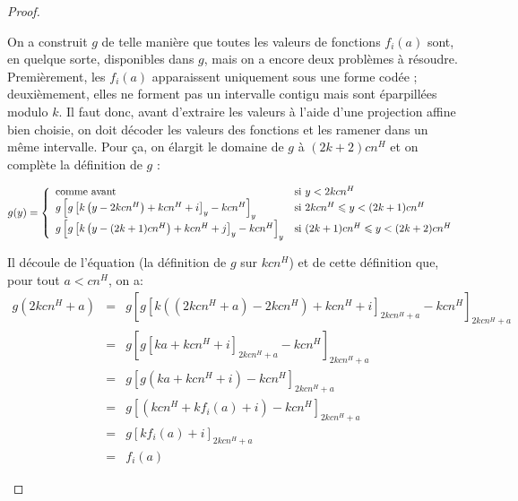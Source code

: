 \documentclass{article}
\begin{document}
\begin{proof}
\begin{enumerate}[itemsep=-1mm,leftmargin=2cm]
					On a construit $g$ de telle manière que toutes les valeurs de fonctions $f_i(a)$ sont, en quelque sorte, disponibles dans $g$, mais on a encore deux problèmes à résoudre. Premièrement, les $f_i(a)$ apparaissent uniquement sous une forme codée ; deuxièmement, elles ne forment pas un intervalle contigu mais sont éparpillées modulo $k$. Il faut donc, avant d'extraire les valeurs à l'aide d'une projection affine bien choisie, on doit décoder les valeurs des fonctions et les ramener dans un même intervalle. Pour ça, on élargit le domaine de $g$ à $(2k+2)cn^H$ et on complète la définition de $g$ :
					
					\[
						g(y) = \left\lbrace \begin{array}{ll} 
							\text{comme avant} & \text{si $y < 2kcn^H$} \\
							g\left[ g\left[ k\left( y - 2kcn^H \right) + kcn^H  + i\right]_y - kcn^H  \right]_y & \text{si $2kcn^H \leqslant y < (2k+1)cn^H$} \\
							g\left[ g\left[ k\left( y - (2k + 1)cn^H \right) + kcn^H  + j \right]_y - kcn^H  \right]_y & \text{si $(2k+1)cn^H \leqslant y < (2k+2)cn^H$} \\
							 \end{array} \right.
					\]
					
					Il découle de l'équation \redtext{$(\star)$} (la définition de $g$ sur $kcn^H$) et de cette définition que, pour tout $a < cn^H$, on a\footnotemark :
					\setcounter{equation}{0}
					\begin{eqnarray}
						g\left( 2kcn^H + a\right)	& = & 		g\left[ g\left[ k\left( \left(2kcn^H + a\right) - 2kcn^H \right) + kcn^H  + i\right]_{2kcn^H + a} - kcn^H  \right]_{2kcn^H + a} \\
													& = & 		g\left[ g\left[ k a + kcn^H  + i\right]_{2kcn^H + a} - kcn^H  \right]_{2kcn^H + a} \\
													& = & 		g\left[ g\left( k a + kcn^H  + i\right) - kcn^H  \right]_{2kcn^H + a} \\
													& = & 		g\left[ \left(kcn^H  +  k f_i(a) + i\right) - kcn^H  \right]_{2kcn^H + a} \\
													& = & 		g\left[ k f_i(a) + i \right]_{2kcn^H + a} \\
													& = & 		f_i(a)
					\end{eqnarray}
					

\end{enumerate}
\end{proof}
\end{document}
